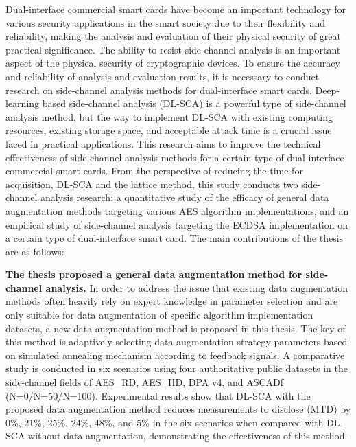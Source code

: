 Dual-interface commercial smart cards have become an important technology for various security applications in the smart society due to their flexibility and reliability, making the analysis and evaluation of their physical security of great practical significance. The ability to resist side-channel analysis is an important aspect of the physical security of cryptographic devices. To ensure the accuracy and reliability of analysis and evaluation results, it is necessary to conduct research on side-channel analysis methods for dual-interface smart cards. Deep-learning based side-channel analysis (DL-SCA) is a powerful type of side-channel analysis method, but the way to implement DL-SCA with existing computing resources, existing storage space, and acceptable attack time is a crucial issue faced in practical applications. This research aims to improve the technical effectiveness of side-channel analysis methods for a certain type of dual-interface commercial smart cards. From the perspective of reducing the time for acquisition, DL-SCA and the lattice method, this study conducts two side-channel analysis research: a quantitative study of the efficacy of general data augmentation methods targeting various AES algorithm implementations, and an empirical study of side-channel analysis targeting the ECDSA implementation on a certain type of dual-interface smart card. The main contributions of the thesis are as follows:

\textbf{The thesis proposed a general data augmentation method for side-channel analysis.} In order to address the issue that existing data augmentation methods often heavily rely on expert knowledge in parameter selection and are only suitable for data augmentation of specific algorithm implementation datasets, a new data augmentation method is proposed in this thesis. The key of this method is adaptively selecting data augmentation strategy parameters based on simulated annealing mechanism according to feedback signals. A comparative study is conducted in six scenarios using four authoritative public datasets in the side-channel fields of AES\_RD, AES\_HD, DPA v4, and ASCADf (N=0/N=50/N=100). Experimental results show that DL-SCA with the proposed data augmentation method reduces measurements
to disclose (MTD) by 0\%, 21\%, 25\%, 24\%, 48\%, and 5\% in the six scenarios when compared with DL-SCA without data augmentation, demonstrating the effectiveness of this method.

